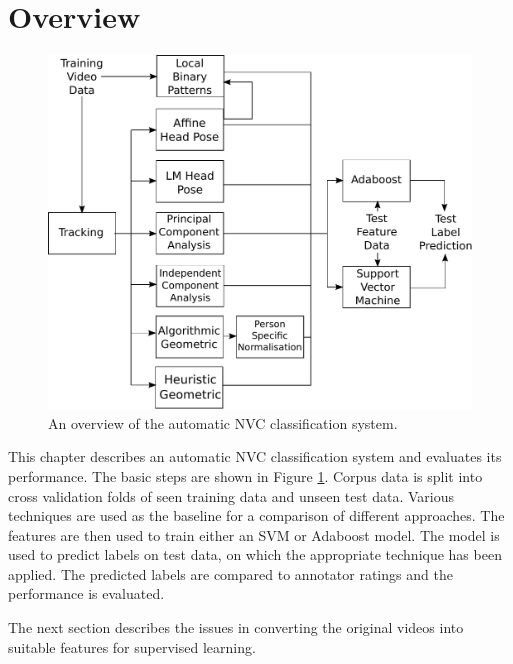 \section{Overview}
\label{SectionClassificationOverview}

\begin{figure}[tb]
\centering
\includegraphics[width = 0.6 \columnwidth]{nvcclass/classSystemOverview.pdf}
\caption{An overview of the automatic \ac{NVC} classification system.}
\label{FigureClassificationOverview}
\end{figure}

This chapter describes an automatic \ac{NVC} classification system and evaluates its performance. 
The basic steps are shown in Figure \ref{FigureClassificationOverview}. Corpus data is split into cross validation folds of seen training data and unseen test data. 
Various \featureGeneration techniques are used as the baseline for a comparison of different approaches. The features are then used to train either an \ac{SVM} or Adaboost model. The model is used to predict labels on test data, on which the appropriate \featureGeneration technique has been applied. The predicted labels are compared to annotator ratings and the performance is evaluated.


The next section describes the issues in converting the original videos into suitable features for supervised learning.

